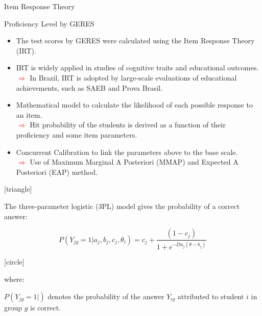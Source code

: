 \documentclass{beamer}
\begin{document}
\begin{frame}[label=IRT]{Item Response Theory}
\vspace{-35pt} \flushright \hyperlink{Mirror}{\beamerbutton{\textcolor{red}{Mirror}}}
\vspace{10pt}
\begin{block}{\centering Proficiency Level by GERES}
 \begin{itemize}
\item [\sbt] \scriptsize The test scores by GERES were calculated using the Item Response Theory (IRT).
\item [\sbt] \scriptsize IRT is widely applied in studies of cognitive traits and educational outcomes.
\\ \tiny\textcolor{red}{$\Longrightarrow$} In Brazil, IRT is adopted by large-scale evaluations of educational achievements, such as SAEB and Prova Brasil.
\item [\sbt] \scriptsize Mathematical model to calculate the likelihood of each possible response to an item.
\\ \tiny\textcolor{red}{$\Longrightarrow$} Hit probability of the students is derived as a function of their proficiency and some item parameters.
\item [\sbt] \scriptsize Concurrent Calibration to link the parameters above to the base scale.
\\ \tiny\textcolor{red}{$\Longrightarrow$} Use of Maximum Marginal A Posteriori (MMAP) and Expected A Posteriori (EAP) method.
\end{itemize}
\end{block}


[triangle]
\begin{itemize} 
{\scriptsize\item The three-parameter logistic (3PL) model gives the probability of a correct answer:}
\end{itemize}

\vspace{-10pt}
\begin{equation} \label{eq:IRT}
P(Y_{jg} = 1 \vert a_j,b_j,c_j,\theta_i) = c_j + \frac{(1-c_j)}{1+e^{-Da_j(\theta-b_j)}}
\end{equation}

[circle]
\begin{flushleft} \hspace{9pt}
{\scriptsize where:}
\end{flushleft}
\vspace{-15pt}
\begin{itemize}
{\tiny\item $P(Y_{jg} = 1 \vert)$ denotes the probability of the answer $Y_{ig}$ attributed to student $i$ in group $g$ is correct.}


\end{itemize}
\end{frame}
\end{document}
